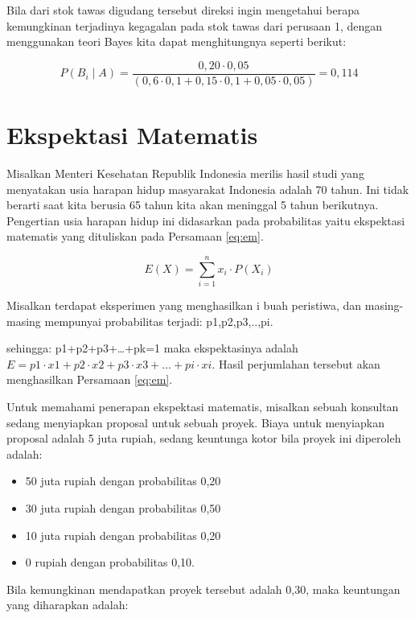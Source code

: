 \documentclass[]{book}
\providecommand{\tightlist}{%
  \setlength{\itemsep}{0pt}\setlength{\parskip}{0pt}}
\begin{document}
Bila dari stok tawas digudang tersebut direksi ingin mengetahui berapa
kemungkinan terjadinya kegagalan pada stok tawas dari perusaan 1, dengan
menggunakan teori Bayes kita dapat menghitungnya seperti berikut:

\[
P\left(B_i\mid A\right)=\frac{0,20\cdot0,05}{\left(0,6\cdot0,1+0,15\cdot0,1+0,05\cdot0,05\right)}=0,114
\]

\section{Ekspektasi Matematis}\label{ekspektasi-matematis}

Misalkan Menteri Kesehatan Republik Indonesia merilis hasil studi yang
menyatakan usia harapan hidup masyarakat Indonesia adalah 70 tahun. Ini
tidak berarti saat kita berusia 65 tahun kita akan meninggal 5 tahun
berikutnya. Pengertian usia harapan hidup ini didasarkan pada
probabilitas yaitu ekspektasi matematis yang dituliskan pada Persamaan
\eqref{eq:em}.

\begin{equation}
   E\left(X\right)=\sum_{i=1}^nx_i\cdot P\left(X_i\right)
  \label{eq:em}
\end{equation}

Misalkan terdapat eksperimen yang menghasilkan i buah peristiwa, dan
masing-masing mempunyai probabilitas terjadi: p1,p2,p3,..,pi.

sehingga: p1+p2+p3+\ldots{}+pk=1 maka ekspektasinya adalah
\(E=p1\cdot x1+p2\cdot x2+p3\cdot x3+...+pi\cdot xi\). Hasil perjumlahan
tersebut akan menghasilkan Persamaan \eqref{eq:em}.

Untuk memahami penerapan ekspektasi matematis, misalkan sebuah konsultan
sedang menyiapkan proposal untuk sebuah proyek. Biaya untuk menyiapkan
proposal adalah 5 juta rupiah, sedang keuntunga kotor bila proyek ini
diperoleh adalah:

\begin{itemize}
\tightlist
\item
  50 juta rupiah dengan probabilitas 0,20
\item
  30 juta rupiah dengan probabilitas 0,50
\item
  10 juta rupiah dengan probabilitas 0,20
\item
  0 rupiah dengan probabilitas 0,10.
\end{itemize}

Bila kemungkinan mendapatkan proyek tersebut adalah 0,30, maka
keuntungan yang diharapkan adalah:
\end{document}
